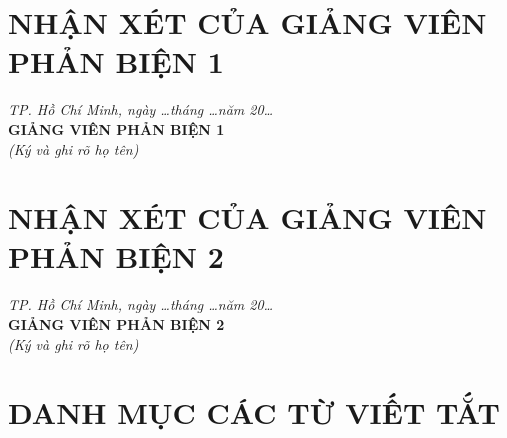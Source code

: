 \newpage
\chapter*{NHẬN XÉT CỦA GIẢNG VIÊN PHẢN BIỆN 1}
\thispagestyle{frontmatter}
\dotline \dotline \dotline \dotline \dotline
\dotline \dotline \dotline \dotline \dotline
\dotline \dotline \dotline 
\vspace{0.5cm}
\begin{flushright}
    \textit{TP. Hồ Chí Minh, ngày \dots tháng \dots năm 20\dots}\\
    \textbf{GIẢNG VIÊN PHẢN BIỆN 1}\\
    \textit{(Ký và ghi rõ họ tên)}\\
    \vspace{1.5cm}
\end{flushright}

\newpage
\chapter*{NHẬN XÉT CỦA GIẢNG VIÊN PHẢN BIỆN 2}
\thispagestyle{frontmatter}
\dotline \dotline \dotline \dotline \dotline
\dotline \dotline \dotline \dotline \dotline
\dotline \dotline \dotline 
\vspace{0.5cm}
\begin{flushright}
    \textit{TP. Hồ Chí Minh, ngày \dots tháng \dots năm 20\dots}\\
    \textbf{GIẢNG VIÊN PHẢN BIỆN 2}\\
    \textit{(Ký và ghi rõ họ tên)}\\
    \vspace{1.5cm}
\end{flushright}

\clearpage
\pagestyle{frontmatter}
\begingroup
\let\clearpage\relax
{}
\tableofcontents
\endgroup
\thispagestyle{frontmatter}

\clearpage
\begingroup
\let\clearpage\relax
{}
\listoffigures
\endgroup
\thispagestyle{frontmatter}

\clearpage
\begingroup
\let\clearpage\relax
{}
\listoftables
\endgroup
\thispagestyle{frontmatter}

\clearpage
\chapter*{DANH MỤC CÁC TỪ VIẾT TẮT}
\thispagestyle{frontmatter}

